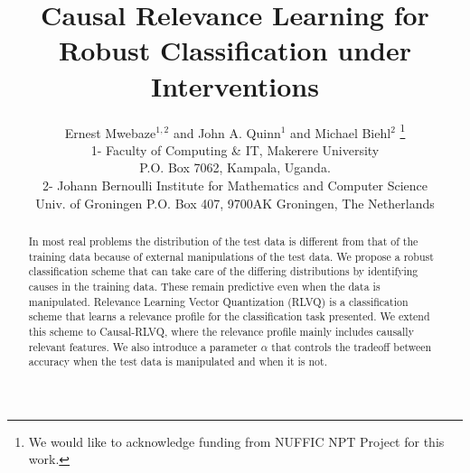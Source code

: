 \documentclass{esannV2}
\begin{document}
\title{Causal Relevance Learning for Robust Classification under Interventions}

\author{Ernest Mwebaze$^{1,2}$ and John A. Quinn$^1$ and Michael Biehl$^2$
%
\thanks{We would like to acknowledge funding from NUFFIC NPT Project for this work.}
%
\vspace{.3cm}\\
%
1- Faculty of Computing \& IT, Makerere University \\
P.O. Box 7062, Kampala, Uganda.%
\vspace{.1cm}\\
2- Johann Bernoulli Institute for Mathematics and Computer Science \\
Univ. of Groningen P.O. Box 407, 9700AK Groningen, The Netherlands\\
}

\maketitle

\begin{abstract}
In most real problems the distribution of the test data is different from that of the training data because of external manipulations of the test data. We propose a robust classification scheme that can take care of the differing distributions by identifying causes in the training data. These remain predictive even when the data is manipulated. Relevance Learning Vector Quantization (RLVQ) is a classification scheme that learns a relevance profile for the classification task presented. We extend this scheme to Causal-RLVQ, where the relevance profile mainly includes causally relevant features. We also introduce a parameter $\alpha$ that controls the tradeoff between accuracy when the test data is manipulated and when it is not.
\end{abstract}
\end{document}
